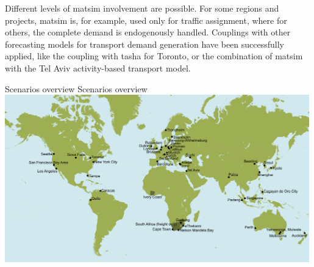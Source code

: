 Different levels of \gls{matsim} involvement are possible. For some regions and projects, \gls{matsim} is, for example, used only for traffic assignment, where for others, the complete demand is endogenously handled. Couplings with other forecasting models for transport demand generation have been successfully applied, like the coupling with \gls{tasha} for Toronto, or the combination of \gls{matsim} with the Tel Aviv activity-based transport model.

\createfigure%
{Scenarios overview}%
{Scenarios overview}%
{\label{fig:scenarios}}%
{\includegraphics[width=0.99\textwidth, angle=0]{./scenarios/figures/MATSimModelsMap}}%
{}



%
%
%
%
%

